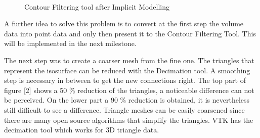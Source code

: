 \begin{figure}
\centering
   \\
   \caption{Contour Filtering tool after Implicit Modelling}
\end{figure}

A further idea to solve this problem is to convert at the first step the volume data into point data
and only then present it to the Contour Filtering Tool. This will be implemented in the next
milestone.

The next step was to create a coarser mesh from the fine one. The triangles that represent the
isosurface can be reduced with the Decimation tool. A smoothing step is necessary in between
to get the new connections right. The top part of figure [2] shows a 50 \% reduction of the
triangles, a noticeable difference can not be perceived. On the lower part a 90 \% reduction is
obtained, it is nevertheless still difficult to see a difference. Triangle meshes can be easily
coarsened since there are many open source algorithms that simplify the triangles. VTK has the
decimation tool which works for 3D triangle data.

